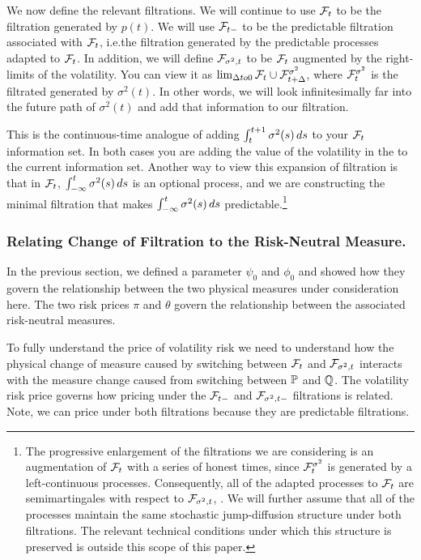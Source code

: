 \documentclass[11pt, letterpaper, twoside, final]{article}
\begin{document}
We now define the relevant filtrations.
We will continue to use $\mathcal{F}_t$ to be the filtration generated by $p(t)$.
We will use $\mathcal{F}_{t-}$ to be the predictable filtration associated with $\mathcal{F}_t$, i.e.\@ the filtration generated by
the predictable processes adapted to $\mathcal{F}_t$.
In addition, we will define $\mathcal{F}_{\sigma^2, t}$ to be $\mathcal{F}_t$ augmented by the right-limits of the volatility. 
You can view it as $\lim_{\Delta to 0} \mathcal{F}_t \cup \mathcal{F}^{\sigma^2}_{t+\Delta}$, where $\mathcal{F}^{\sigma^2}_t$ is the
filtrated generated by $\sigma^2(t)$.
In other words, we will look infinitesimally far into the future path of $\sigma^2(t)$ and add that information to
our filtration.

This is the continuous-time analogue of adding $\int_t^{t+1} \sigma^2(s) \mathop{}\!d s$ to your $\mathcal{F}_t$ information set.
In both cases you are adding the value of the volatility in the  to the current information
set.
Another way to view this expansion of filtration is that in $\mathcal{F}_t$, $\int^t_{-\infty} \sigma^2(s) \mathop{}\!d s$ is an
optional process, and we are constructing the minimal filtration that makes $\int^t_{-\infty} \sigma^2(s) \mathop{}\!d s$
predictable.\footnote{The progressive enlargement of the filtrations we are considering is an augmentation of
    $\mathcal{F}_t$ with a series of honest times, since $\mathcal{F}^{\sigma^2}_{t}$ is generated by a left-continuous processes.
    Consequently, all of the adapted processes to $\mathcal{F}_t$ are semimartingales with respect to $\mathcal{F}_{\sigma^2,t}$,
    \parencite[Theorem C]{barlow1978study}.  We will further assume that all of the processes maintain the same
stochastic jump-diffusion structure under both filtrations. The relevant technical conditions under which this
structure is preserved is outside this scope of this paper.}


\subsubsection{Relating Change of Filtration to the Risk-Neutral Measure.}

In the previous section, we defined a parameter $\psi_0$ and $\phi_0$ and showed how they govern the
relationship between the two physical measures under consideration here.
The two risk prices $\pi$ and $\theta$ govern the relationship between the associated risk-neutral measures.


To fully understand the price of volatility risk we need to understand how the physical change of measure
caused  by switching between $\mathcal{F}_t$ and $\mathcal{F}_{\sigma^2,t}$ interacts with the measure change caused from switching
between $\mathbb{P}$ and $\mathbb{Q}$.
The volatility risk price governs how pricing under the $\mathcal{F}_{t-}$ and $\mathcal{F}_{\sigma^2,t-}$ filtrations is related.
Note, we can price under both filtrations because they are predictable filtrations.
\end{document}

